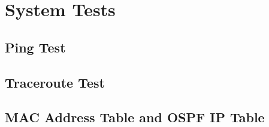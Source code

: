 \section{System Tests}
\subsection{Ping Test}

\subsection{Traceroute Test}

\subsection{MAC Address Table and OSPF IP Table}
